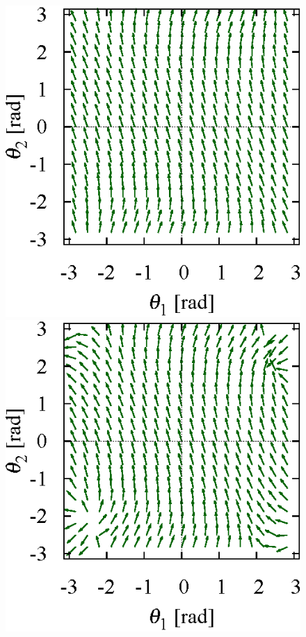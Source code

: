 %
\begin{figure}[t]
  \centering
  \begin{minipage}[t]{0.30\linewidth}
    \centering
    \includegraphics[width=1.0\linewidth]{fig/chapter3/planar/0.5.eps}
    \hspace{2mm}
  \end{minipage}
  \begin{minipage}[t]{0.30\linewidth}
    \centering
    \includegraphics[width=1.0\linewidth]{fig/chapter3/planar/0.945.eps}

\end{minipage}
\end{figure}
